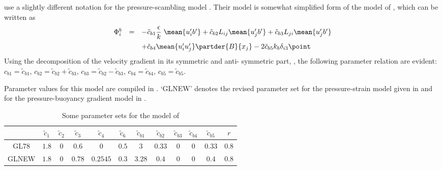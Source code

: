 \cite{GibsonLaunder78} use a slightly different notation for the pressure-scambling 
model . Their model is somewhat simplified form of the model of 
\cite{Jinetal2003}, which can be written as
\begin{equation}
  \label{PhibGL78}
  \begin{array}{rcl}
    \Phi^b_i  &=& - \tilde{c}_{b 1} \dfrac{\epsilon}{k} \; \mean{u'_i b'} 
    + \tilde{c}_{b 2} L_{ij}  \mean{u'_j b'} + \tilde{c}_{b 3} L_{ji} \mean{u'_j b'} \\[3mm]
    & & + \tilde{c}_{b 4} \mean{u'_i u'_j} \partder{B}{x_j} 
    - 2 \tilde{c}_{b 5} k_b \delta_{i3}
  \point
  \end{array}
\end{equation}
Using the decomposition of the velocity gradient in its symmetric and anti-
symmetric part, , the following parameter relation are evident:
$c_{b1} = \tilde{c}_{b1}$, $c_{b2} = \tilde{c}_{b2} + \tilde{c}_{b3}$,
$c_{b3} = \tilde{c}_{b2} - \tilde{c}_{b3}$, $c_{b4} = \tilde{c}_{b4}$, 
$c_{b5} = \tilde{c}_{b5}$. 


Parameter values for this model are compiled in . `GLNEW' denotes 
the revised parameter set for the pressure-strain model given in \cite{Wilcox98} and 
for the pressure-buoyancy gradient model in \cite{Zhaoetal2001}.
\begin{table}
 \begin{tabular}{c|ccccccccccc}                                                   
        & $\tilde{c}_1$      & $\tilde{c}_2$      &  $\tilde{c}_3$      &  $\tilde{c}_4$  & $\tilde{c}_6$  &   
          $ \tilde{c}_{b1}$  & $ \tilde{c}_{b2}$  &  $ \tilde{c}_{b3}$  &
          $ \tilde{c}_{b4}$  & $ \tilde{c}_{b5}$  &  $r$                                               \\ \hline  
GL78    & $1.8$              & $0$                &  $0.6$              &  $0$            &  $0.5$         & 
          $3$                & $0.33$             &  $0$                &  
          $0$                & $0.33$             &  $0.8$                                              \\ 
GLNEW   & $1.8$              & $0$                &  $0.78$             &  $0.2545$       &  $0.3$         & 
          $3.28$             & $0.4$              &  $0$                &  
          $0$                & $0.4$              &  $0.8$                                              \\ 
 \end{tabular}
 \caption{\label{tab:LRR}Some parameter sets for the model of \cite{GibsonLaunder78}}
\end{table}




